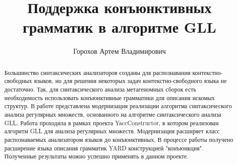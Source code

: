 \title{Поддержка конъюнктивных грамматик в алгоритме GLL}


\author{Горохов Артем Владимирович}



\maketitle             

\begin{abstract}
Большинство синтаксических анализаторов созданы для распознавания контекстно-свободных языков, но для решения некоторых задач контекстно-свободного языка не достаточно. Так, для синтаксического анализа метагеномных сборок есть необходимость использовать конъюнктивные грамматики для описания искомых структур. В работе представлена модернизация реализации алгоритма синтаксического анализа регулярных множеств, основанного на алгоритме синтаксического анализа GLL. Работа проходила в рамках проекта YaccConstructor, в котором реализован алгоритм GLL для анализа регулярных множеств. Модернизация расширяет класс распознаваемых анализатором языков до конъюнктивных. В процессе работы получено расширение языка описания грамматик YARD конструкцией "конъюнкция". Полученные результаты можно успешно применять в данном проекте.
\end{abstract}








